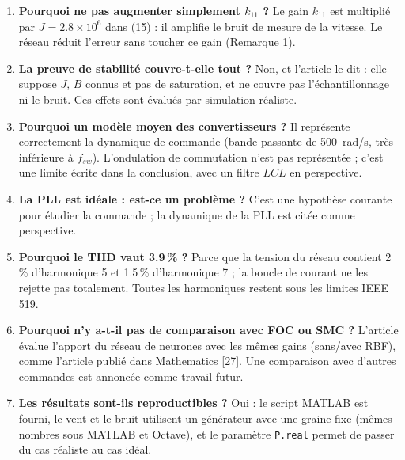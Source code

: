 \documentclass[11pt,a4paper]{article}
\begin{document}
\begin{enumerate}[itemsep=5pt,leftmargin=*]
\item \textbf{Pourquoi ne pas augmenter simplement $k_{11}$ ?}
Le gain $k_{11}$ est multiplié par $J=2.8\times10^6$ dans (15) : il amplifie le bruit de mesure de la
vitesse. Le réseau réduit l'erreur sans toucher ce gain (Remarque 1).

\item \textbf{La preuve de stabilité couvre-t-elle tout ?}
Non, et l'article le dit : elle suppose $J$, $B$ connus et pas de saturation, et ne couvre pas
l'échantillonnage ni le bruit. Ces effets sont évalués par simulation réaliste.

\item \textbf{Pourquoi un modèle moyen des convertisseurs ?}
Il représente correctement la dynamique de commande (bande passante de 500~rad/s, très inférieure à
$f_{sw}$). L'ondulation de commutation n'est pas représentée ; c'est une limite écrite dans la conclusion,
avec un filtre $LCL$ en perspective.

\item \textbf{La PLL est idéale : est-ce un problème ?}
C'est une hypothèse courante pour étudier la commande ; la dynamique de la PLL est citée comme perspective.

\item \textbf{Pourquoi le THD vaut 3.9\,\% ?}
Parce que la tension du réseau contient 2\,\% d'harmonique 5 et 1.5\,\% d'harmonique 7 ; la boucle de
courant ne les rejette pas totalement. Toutes les harmoniques restent sous les limites IEEE 519.

\item \textbf{Pourquoi n'y a-t-il pas de comparaison avec FOC ou SMC ?}
L'article évalue l'apport du réseau de neurones avec les mêmes gains (sans/avec RBF), comme l'article
publié dans Mathematics [27]. Une comparaison avec d'autres commandes est annoncée comme travail futur.

\item \textbf{Les résultats sont-ils reproductibles ?}
Oui : le script MATLAB est fourni, le vent et le bruit utilisent un générateur avec une graine fixe
(mêmes nombres sous MATLAB et Octave), et le paramètre \texttt{P.real} permet de passer du cas réaliste
au cas idéal.
\end{enumerate}
\end{document}
